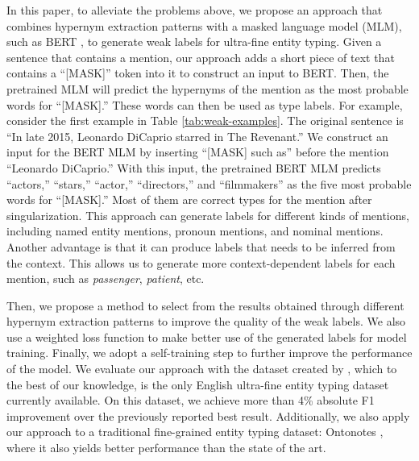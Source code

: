 \documentclass[11pt,a4paper]{article}
\begin{document}
In this paper, to alleviate the problems above, we propose an approach that combines hypernym extraction patterns \cite{hearst1992automatic,seitner2016large} with a masked language model {(MLM), such as BERT \cite{devlin2019bert},} to generate weak labels for ultra-fine entity typing.
Given a sentence that contains a mention, our approach adds a short piece of text that contains a ``[MASK]'' token into it to construct an input {to BERT}. Then, the pretrained MLM will predict the hypernyms of the mention as the most probable words for ``[MASK].'' These words can then be used as type labels.
{For example}, consider the first {example} in Table \ref{tab:weak-examples}. The original sentence is ``In late 2015, Leonardo DiCaprio starred in The Revenant.'' We construct an input for the BERT MLM by inserting ``[MASK] such as'' before the mention ``Leonardo DiCaprio.'' With this input, the pretrained BERT MLM predicts ``actors,'' ``stars,'' ``actor,'' ``directors,'' {and} ``filmmakers'' as the five most probable words for ``[MASK].'' Most of them are correct types for the mention after singularization.
{This approach can generate labels for different kinds of mentions, including named entity mentions, pronoun mentions, and nominal mentions. Another advantage is that it can produce labels that needs to be inferred from the context. This allows us to generate more context-dependent labels for each mention, such as \textit{passenger}, \textit{patient}, etc.}













Then, we propose a method to select from the results obtained through different hypernym extraction patterns to improve the quality of the weak labels. We also use a weighted loss function to make better use of the generated labels for model training. Finally, we adopt a self-training step to further improve the performance of the model. We evaluate our approach with the dataset created by \citet{choi2018ultra}, which to the best of our knowledge, is the only English ultra-fine entity typing dataset currently available. On this dataset, we achieve more than 4\% absolute F1 improvement over the previously reported best result.
Additionally, we also apply our approach to a traditional fine-grained entity typing dataset: Ontonotes \cite{gillick2014context}, where it also yields better performance than the state of the art.
\end{document}
